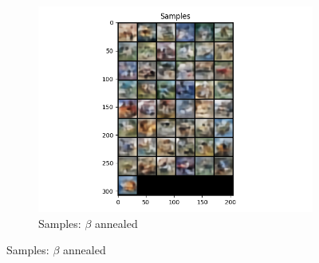 \documentclass[11pt,addpoints,answers]{exam}
\numberwithin{equation}{section} %
\numberwithin{figure}{section} %
\numberwithin{table}{section} %
\begin{document}
\begin{questions}
\begin{figure}[H]
\begin{subfigure}[b]{0.32\linewidth}
    \includegraphics[width=\linewidth]{2.2f.png}
    \caption{Samples: $\beta$ annealed}
    \end{subfigure}
\end{figure}
\end{questions}
\newpage
\end{document}
